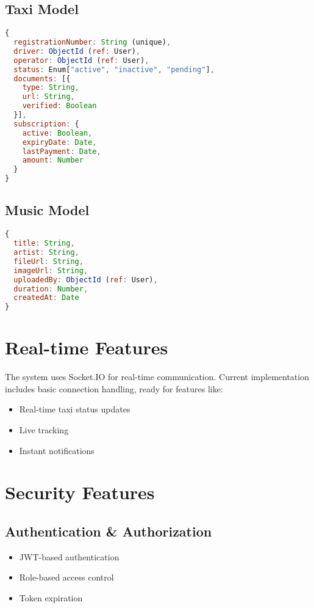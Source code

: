 \documentclass[11pt,a4paper]{article}
\begin{document}
\subsection{Taxi Model}
\begin{lstlisting}[language=javascript]
{
  registrationNumber: String (unique),
  driver: ObjectId (ref: User),
  operator: ObjectId (ref: User),
  status: Enum["active", "inactive", "pending"],
  documents: [{
    type: String,
    url: String,
    verified: Boolean
  }],
  subscription: {
    active: Boolean,
    expiryDate: Date,
    lastPayment: Date,
    amount: Number
  }
}
\end{lstlisting}

\subsection{Music Model}
\begin{lstlisting}[language=javascript]
{
  title: String,
  artist: String,
  fileUrl: String,
  imageUrl: String,
  uploadedBy: ObjectId (ref: User),
  duration: Number,
  createdAt: Date
}
\end{lstlisting}

\section{Real-time Features}
The system uses Socket.IO for real-time communication. Current implementation includes basic connection handling, ready for features like:
\begin{itemize}
    \item Real-time taxi status updates
    \item Live tracking
    \item Instant notifications
\end{itemize}

\section{Security Features}
\subsection{Authentication \& Authorization}
\begin{itemize}
    \item JWT-based authentication
    \item Role-based access control
    \item Token expiration
\end{itemize}
\end{document}
